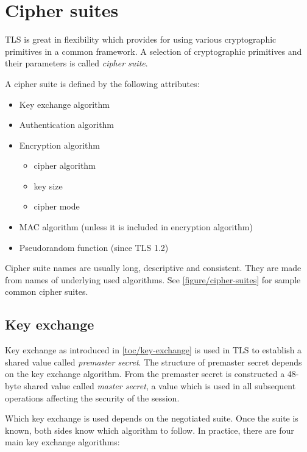 \section{Cipher suites}

TLS is great in flexibility which provides for using various cryptographic primitives in a common framework. A selection of cryptographic primitives and their parameters is called \textit{cipher suite}.

A cipher suite is defined by the following attributes:

\begin{itemize}
  \item Key exchange algorithm
  \item Authentication algorithm
  \item Encryption algorithm
  \begin{itemize}
    \item cipher algorithm
    \item key size
    \item cipher mode
  \end{itemize}
  \item MAC algorithm (unless it is included in encryption algorithm)
  \item Pseudorandom function (since TLS 1.2)
\end{itemize}

Cipher suite names are usually long, descriptive and consistent. They are made from names of underlying used algorithms. See \autoref{figure/cipher-suites} for sample common cipher suites.

\subsection{Key exchange}

Key exchange as introduced in \autoref{toc/key-exchange} is used in TLS to establish a shared value called \textit{premaster secret}. The structure of premaster secret depends on the key exchange algorithm. From the premaster secret is constructed a 48-byte shared value called \textit{master secret}, a value which is used in all subsequent operations affecting the security of the session.

Which key exchange is used depends on the negotiated suite. Once the suite is known, both sides know which algorithm to follow. In practice, there are four main key exchange algorithms:

